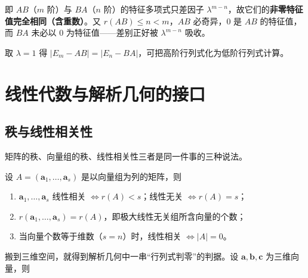 即 $AB$（$m$ 阶）与 $BA$（$n$ 阶）的特征多项式只差因子 $\lambda^{m-n}$，故它们的\textbf{非零特征值完全相同（含重数）}。又 $r(AB)\le n<m$，$AB$ 必奇异，$0$ 是 $AB$ 的特征值，而 $BA$ 未必以 $0$ 为特征值——差别正好被 $\lambda^{m-n}$ 吸收。

\begin{corollary}
取 $\lambda=1$ 得 $|E_m-AB|=|E_n-BA|$，可把高阶行列式化为低阶行列式计算。
\end{corollary}


\section{线性代数与解析几何的接口}

\subsection{秩与线性相关性}

矩阵的秩、向量组的秩、线性相关性三者是同一件事的三种说法。

\begin{theorem}
设 $A=(\boldsymbol{a}_1,\dots,\boldsymbol{a}_s)$ 是以向量组为列的矩阵，则
\begin{enumerate}
\item $\boldsymbol{a}_1,\dots,\boldsymbol{a}_s$ 线性相关 $\iff r(A)<s$；线性无关 $\iff r(A)=s$；
\item $r(\boldsymbol{a}_1,\dots,\boldsymbol{a}_s)=r(A)$，即极大线性无关组所含向量的个数；
\item 当向量个数等于维数（$s=n$）时，线性相关 $\iff|A|=0$。
\end{enumerate}
\end{theorem}

搬到三维空间，就得到解析几何中一串“行列式判零”的判据。设 $\boldsymbol{a},\boldsymbol{b},\boldsymbol{c}$ 为三维向量，则


